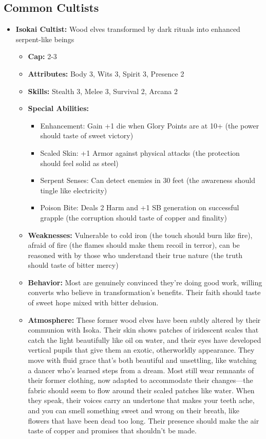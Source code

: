 \documentclass[11pt]{article}
\begin{document}
\subsection{Common Cultists}
\begin{itemize}
\item \textbf{Isokai Cultist:} Wood elves transformed by dark rituals into enhanced serpent-like beings
  \begin{itemize}
  \item \textbf{Cap:} 2-3
  \item \textbf{Attributes:} Body 3, Wits 3, Spirit 3, Presence 2
  \item \textbf{Skills:} Stealth 3, Melee 3, Survival 2, Arcana 2
  \item \textbf{Special Abilities:}
    \begin{itemize}
    \item Enhancement: Gain +1 die when Glory Points are at 10+ (the power should taste of sweet victory)
    \item Scaled Skin: +1 Armor against physical attacks (the protection should feel solid as steel)
    \item Serpent Senses: Can detect enemies in 30 feet (the awareness should tingle like electricity)
    \item Poison Bite: Deals 2 Harm and +1 SB generation on successful grapple (the corruption should taste of copper and finality)
    \end{itemize}
  \item \textbf{Weaknesses:} Vulnerable to cold iron (the touch should burn like fire), afraid of fire (the flames should make them recoil in terror), can be reasoned with by those who understand their true nature (the truth should taste of bitter mercy)
  \item \textbf{Behavior:} Most are genuinely convinced they're doing good work, willing converts who believe in transformation's benefits. Their faith should taste of sweet hope mixed with bitter delusion.
  \item \textbf{Atmosphere:} These former wood elves have been subtly altered by their communion with Isoka. Their skin shows patches of iridescent scales that catch the light beautifully like oil on water, and their eyes have developed vertical pupils that give them an exotic, otherworldly appearance. They move with fluid grace that's both beautiful and unsettling, like watching a dancer who's learned steps from a dream. Most still wear remnants of their former clothing, now adapted to accommodate their changes—the fabric should seem to flow around their scaled patches like water. When they speak, their voices carry an undertone that makes your teeth ache, and you can smell something sweet and wrong on their breath, like flowers that have been dead too long. Their presence should make the air taste of copper and promises that shouldn't be made.
  \end{itemize}


\end{itemize}
\end{document}

